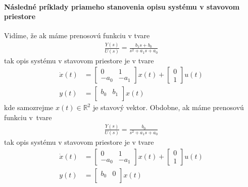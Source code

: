 \documentclass[a4paper, 10pt, ]{article}
\begin{document}
\paragraph{Následné príklady priameho stanovenia opisu systému v stavovom priestore}

Vidíme, že ak máme prenosovú funkciu v tvare
\begin{align} \label{tfVseob02}
	\frac{Y(s)}{U(s)} = \frac{b_1 s + b_0}{ s^2 + a_1 s + a_0}
\end{align}
tak opis systému v stavovom priestore je v tvare
\begin{subequations}
\begin{align}
    \dot x(t)
    &=
    \begin{bmatrix}
    	0 & 1 \\
    	- a_0 & - a_1
  	\end{bmatrix}
    x(t)
    +
    \begin{bmatrix}
    	  0 \\
          1
 	\end{bmatrix}
    u(t)
    \\
    y(t)
    &=
    \begin{bmatrix}
        b_0 & b_1 \\
    \end{bmatrix}
    x(t)
\end{align}
\end{subequations}
kde samozrejme $x(t) \in \mathbb R^2$ je stavový vektor. 
Obdobne, ak máme prenosovú funkciu v~tvare
\begin{align} 
	\frac{Y(s)}{U(s)} = \frac{b_0}{ s^2 + a_1 s + a_0}
\end{align}
tak opis systému v stavovom priestore je v tvare
\begin{subequations}
\begin{align}
    \dot x(t)
    &=
    \begin{bmatrix}
    	0 & 1 \\
    	- a_0 & - a_1
  	\end{bmatrix}
    x(t)
    +
    \begin{bmatrix}
    	  0 \\
          1
 	\end{bmatrix}
    u(t)
    \\
    y(t)
    &=
    \begin{bmatrix}
        b_0 & 0 \\
    \end{bmatrix}
    x(t)
\end{align}
\end{subequations}
\end{document}
